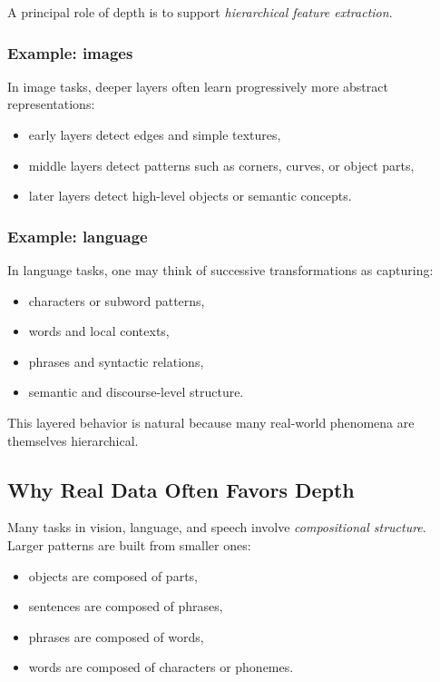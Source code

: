 A principal role of depth is to support \emph{hierarchical feature extraction}.

\subsubsection{Example: images}

In image tasks, deeper layers often learn progressively more abstract representations:
\begin{itemize}
    \item early layers detect edges and simple textures,
    \item middle layers detect patterns such as corners, curves, or object parts,
    \item later layers detect high-level objects or semantic concepts.
\end{itemize}

\subsubsection{Example: language}

In language tasks, one may think of successive transformations as capturing:
\begin{itemize}
    \item characters or subword patterns,
    \item words and local contexts,
    \item phrases and syntactic relations,
    \item semantic and discourse-level structure.
\end{itemize}

This layered behavior is natural because many real-world phenomena are themselves hierarchical.

\subsection{Why Real Data Often Favors Depth}

Many tasks in vision, language, and speech involve \emph{compositional structure}. Larger patterns are built from smaller ones:
\begin{itemize}
    \item objects are composed of parts,
    \item sentences are composed of phrases,
    \item phrases are composed of words,
    \item words are composed of characters or phonemes.
\end{itemize}

